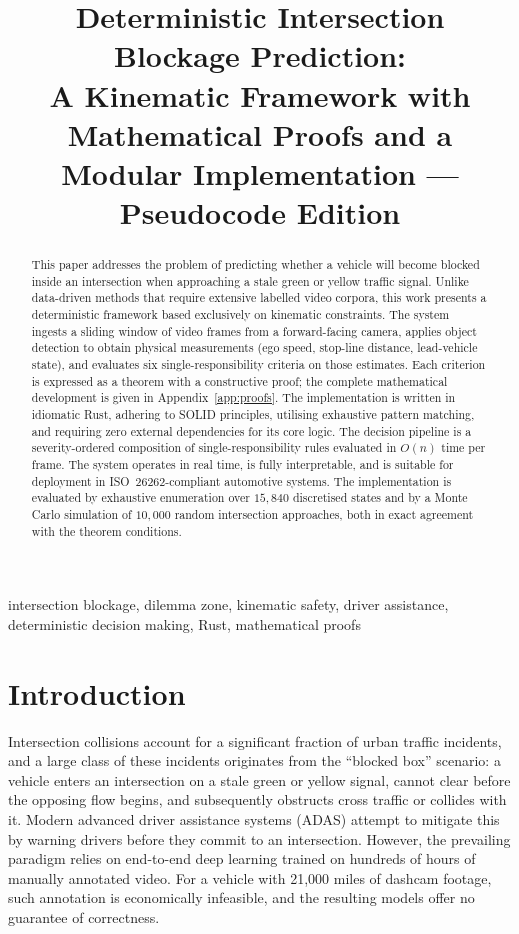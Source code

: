 \documentclass[conference, a4paper]{IEEEtran}
\title{Deterministic Intersection Blockage Prediction:\\A Kinematic Framework with Mathematical Proofs and a Modular Implementation --- Pseudocode Edition}
\author{\IEEEauthorblockN{Arpan Pathak}
\IEEEauthorblockA{Driving CivicSense Research}}
\date{}
\theoremstyle{plain}
\begin{document}
\maketitle

\begin{abstract}
This paper addresses the problem of predicting whether a vehicle will become
blocked inside an intersection when approaching a stale green or yellow
traffic signal. Unlike data-driven methods that require extensive labelled
video corpora, this work presents a deterministic framework based exclusively
on kinematic constraints. The system ingests a sliding window of video frames
from a forward-facing camera, applies object detection to obtain physical
measurements (ego speed, stop-line distance, lead-vehicle state), and
evaluates six single-responsibility criteria on those estimates. Each criterion is
expressed as a theorem with a constructive proof; the complete mathematical
development is given in Appendix~\ref{app:proofs}. The implementation is
written in idiomatic Rust, adhering to SOLID principles, utilising exhaustive
pattern matching, and requiring zero external dependencies for its core
logic. The decision pipeline is a severity-ordered composition of
single-responsibility rules evaluated in $O(n)$ time per frame. The
system operates in real time, is fully interpretable, and is suitable for
deployment in ISO~26262-compliant automotive systems. The implementation
is evaluated by exhaustive enumeration over $15{,}840$ discretised states and
by a Monte Carlo simulation of $10{,}000$ random intersection approaches,
both in exact agreement with the theorem conditions.
\end{abstract}

\begin{IEEEkeywords}
intersection blockage, dilemma zone, kinematic safety, driver assistance,
deterministic decision making, Rust, mathematical proofs
\end{IEEEkeywords}

\section{Introduction}
\label{sec:intro}

Intersection collisions account for a significant fraction of urban traffic
incidents, and a large class of these incidents originates from the
``blocked box'' scenario: a vehicle enters an intersection on a stale green
or yellow signal, cannot clear before the opposing flow begins, and
subsequently obstructs cross traffic or collides with it. Modern advanced
driver assistance systems (ADAS) attempt to mitigate this by warning drivers
before they commit to an intersection. However, the prevailing paradigm
relies on end-to-end deep learning trained on hundreds of hours of manually
annotated video. For a vehicle with 21{,}000 miles of dashcam footage, such
annotation is economically infeasible, and the resulting models offer no
guarantee of correctness.
\end{document}
